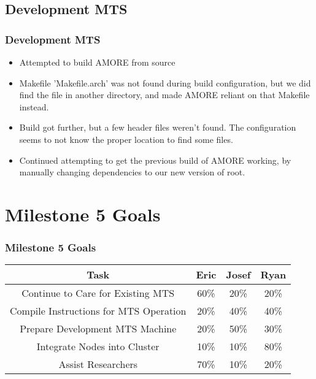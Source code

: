\documentclass[aspectratio=169]{beamer}
\begin{document}


\subsection{Development MTS}

\begin{frame}

  \frametitle{Development MTS}

  \begin{itemize}
    \item Attempted to build AMORE from source
    \item Makefile 'Makefile.arch' was not found during build configuration, but we did
          find the file in another directory, and made AMORE reliant on that Makefile
          instead.
    \item Build got further, but a few header files weren't found. The configuration seems to not know the proper location to find some           files.
    \item Continued attempting to get the previous build of AMORE working, by
    	  manually changing dependencies to our new version of root.
  \end{itemize}


\end{frame}




\section{Milestone 5 Goals}

\begin{frame}

  \frametitle{Milestone 5 Goals}

  \begin{center}
  \begin{tabular}{|c|c|c|c|}
    \hline
    Task & Eric & Josef & Ryan \\
    \hline
    Continue to Care for Existing MTS & 60\% & 20\% & 20\% \\
    Compile Instructions for MTS Operation & 20\% & 40\% & 40\% \\
    Prepare Development MTS Machine & 20\% & 50\% & 30\% \\
    Integrate Nodes into Cluster & 10\% & 10\% & 80\% \\
    Assist Researchers & 70\% & 10\% & 20\% \\
    \hline
  \end{tabular}
\end{center}

\end{frame}
\end{document}
